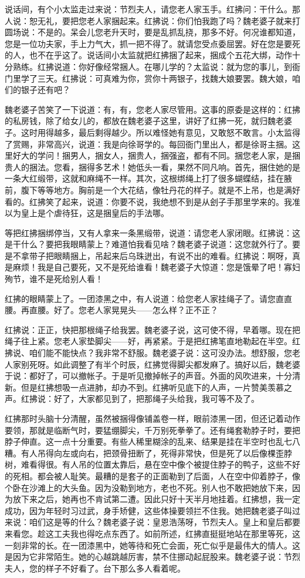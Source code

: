 说话间，有个小太监走过来说：节烈夫人，请您老人家玉手。红拂问：干什么。那人说：恕无礼，要把您老人家捆起来。红拂说：你们怕我跑了吗？魏老婆子就来打圆场说：不是的。呆会儿您老升天时，要是乱抓乱挠，那多不好。何况谁都知道，您是一位功夫家，手上力气大，抓一把不得了。就请您受点委屈罢。好在您是要死的人，也不在乎这了。说话间小太监就把红拂捆了起来，捆成个五花大绑，动作十分熟练。红拂说道：你好像经常捆人。在哪儿学的？太监说：就为您的事儿，到衙门里学了三天。红拂说：可真难为你，赏你十两银子，找魏大娘要罢。魏大娘，咱们的银子还有吧？ 

魏老婆子苦笑了一下说道：有，有，您老人家尽管用。这事的原委是这样的：红拂的私房钱，除了给女儿的，都放在魏老婆子这里，讲好了红拂一死，就归魏老婆子。这时用得越多，最后剩得越少。所以难怪她有意见，又敢怒不敢言。小太监得了赏赐，非常高兴，说道：我是向徐哥学的。每回衙门里出人，都是徐哥主捆。这里好大的学问！捆男人，捆女人，捆贵人，捆强盗，都有不同。捆您老人家，是捆贵人的捆法。您看，捆得多艺术！她低头一看，果然不同凡响。首先，捆住她的是一条大红缎带，这就和麻绳不一样。其次，这根绑绳上打了很多蝴蝶结，挂在腋前，腹下等等地方。胸前是一个大花结，像牡丹花的样子。就是不上吊，也是满好看的。红拂笑了起来，说道：你要不说，我绝想不到是从刽子手那里学来的。我准以为皇上是个虐待狂，这是捆皇后的手法哪。 

等把红拂捆绑停当，又有人拿来一条黑缎带，说道：请您老人家闭眼。红拂说：这是干什么？要把我眼睛蒙上？难道怕我看见啥？魏老婆子说道：这您就外行了。要是不拿带子把眼睛捆上，吊起来后乌珠迸出，有说不出的难看。红拂说：啊呀，真是麻烦！我是自己要死，又不是死给谁看！魏老婆子大惊道：您是饿晕了吧！寡妇殉节，谁不是死给别人看！ 

红拂的眼睛蒙上了。一团漆黑之中，有人说道：给您老人家挂绳子了。请您直直腰。再直腰。好了。您老人家晃晃头——怎么样？正不正？ 

红拂说：正正，快把那根绳子给我罢。魏老婆子说，这可使不得，早着哪。现在把绳子往上紧。您老人家垫脚尖——好，再紧紧。于是把红拂笔直地勒起在半空。红拂说、咱们能不能快点？我非常不舒服。魏老婆子说：这可没办法。想舒服，您老人家别死呀。如此调整了有半个时辰，红拂觉得脚尖都发麻了。搞好以后，魏老婆于说：都好了，可以撤帐子。于是听见撤掉帐子的声音。外面的风吹进来，十分清新。但是红拂想吸一点进肺，却办不到。红拂听见底下的人声，一片赞美羡慕之声。红拂说：好了，大家都见到了，把那绳子头给我，我可等不及了。 

红拂那时头脑十分清醒，虽然被捆得像铺盖卷一样，眼前漆黑一团，但还记着动作要领，那就是临断气时，要猛绷脚尖，千万别死拳拳了。还有绳套勒脖子时，要把脖子伸直。这一点十分重要。有些人稀里糊涂的乱来、结果是挂在半空时也乱七八糟。有人吊得向左或向右，把颈骨扭断了，死得非常快，但是死了以后像棵歪脖树，难看得很。有人吊的位置太靠后，悬在空中像个被提住脖子的鸭子，这些不好的死相。都会被人耻笑。最糟的是套子的正面勒到了后面，人在空中仰着脖子，像个卧在沙滩上的大头鱼。因为没勒到地方，老也不死。别人也不敢把她放下来，因为放下来之后，她再也不肯试第二遭。因此只好十天半月地挂着。红拂想，我一定成功，因为年轻时习过武，身手矫健，这些体操要领拦不住我。她把魏老婆子叫过来说：咱们这是等的什么？魏老婆子说：皇恩浩荡呀，节烈夫人。皇上和皇后都要来看您。趁这工夫我也得吃点东西了。如前所述，红拂直挺挺地站在那里等死，这一刻非常的长。在一团漆黑中，她等待和死亡会面，死亡似乎是最伟大的情人。这是因为它非常陌生。她的心越跳越厉害，禁不住挪动起屁股来。魏老婆子说：节烈夫人，您的样子不好看了。台下那么多人看着呢。 

